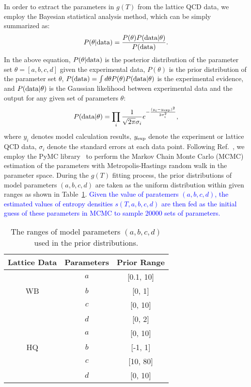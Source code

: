 \documentclass[aps,superscriptaddress,prc,twocolumn,nofootinbib]{revtex4}
\begin{document}
In order to extract the parameters in $g(T)$ from the lattice QCD data, we employ the Bayesian statistical analysis method, which can be simply summarized as:
\begin{align}
P(\theta | {\rm data}) = \frac{P(\theta) P({\rm data} | \theta)}{P({\rm data})}.
\end{align}
In the above equation, $P(\theta | {\rm data})$ is the posterior distribution of the parameter set $\theta =[a,b,c,d]$ given the experimental data, $P(\theta)$ is the prior distribution of the parameter set $\theta$, $P({\rm data}) = \int d\theta P(\theta) P({\rm data}|\theta)$ is the experimental evidence, and $P({\rm data} | \theta)$ is the Gaussian likelihood between experimental data and the output for any given set of parameters $\theta$:
\begin{align}
P({\rm data} | \theta) = \prod_i \frac{1}{\sqrt{2 \pi} \sigma_i} e^{- \frac{(y_i - y_\mathrm{exp})^2}{2 \sigma_i^2}},
\end{align}
where $y_i$ denotes model calculation results, $y_{\rm exp}$ denote the experiment or lattice QCD data, $\sigma_i$ denote the standard errors at each data point.
Following Ref.~\cite{He:2018gks}, we employ the PyMC library~\cite{pymc_bib} to perform the Markov Chain Monte Carlo (MCMC) estimation of the parameters with Metropolis-Hastings random walk in the parameter space.
During the $g(T)$ fitting process, the prior distributions of model parameters $(a,b,c,d)$ are taken as the uniform distribution within given ranges as shown in Table~\ref{tab:1}. \textcolor{blue}{Given the value of paratemers $(a,b,c,d)$, the estimated values of entropy densities $s(T,a,b,c,d)$  are then fed as the initial guess of these parameters in MCMC to sample 20000 sets of parameters.} %


\begin{table}[htb]
\centering
\vspace{-5pt}
\begin{tabular}{c|c|c}
 \hline
 Lattice Data & Parameters & Prior Range  \\
 \hline
    & $a$ & [0.1, 10]    \\
  WB   & $b$ & [0, 1]  \\
      & $c$ & [0, 10]   \\
      & $d$ & [0, 2]   \\ \hline
   & $a$ & [0, 10]   \\
  HQ   & $b$ & [-1, 1]  \\
  	  & $c$ & [10, 80]  \\
  	  & $d$ & [0, 10]   \\
  \hline
\end{tabular}
	\caption{The ranges of model parameters $(a,b,c,d)$ used in the prior distributions.}
\label{tab:1}
\end{table}
\end{document}

